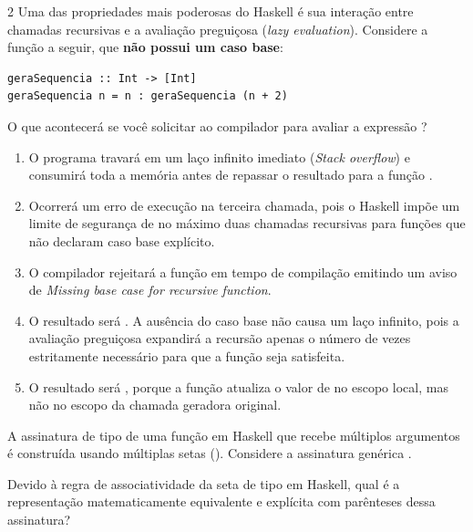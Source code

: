 \documentclass[a4paper,10pt,brazil]{article}
\begin{document}
\begin{multicols}{2}
Uma das propriedades mais poderosas do Haskell é sua interação entre chamadas recursivas e a avaliação preguiçosa (\emph{lazy evaluation}). Considere a função a seguir, que \textbf{não possui um caso base}:

\begin{verbatim}
geraSequencia :: Int -> [Int]
geraSequencia n = n : geraSequencia (n + 2)
\end{verbatim}

O que acontecerá se você solicitar ao compilador para avaliar a expressão ?

\begin{enumerate}
  \item O programa travará em um laço infinito imediato (\emph{Stack overflow}) e consumirá toda a memória antes de repassar o resultado para a função .

  \item Ocorrerá um erro de execução na terceira chamada, pois o Haskell impõe um limite de segurança de no máximo duas chamadas recursivas para funções que não declaram caso base explícito.
  \item O compilador rejeitará a função  em tempo de compilação emitindo um aviso de \emph{Missing base case for recursive function}.

  \item O resultado será \haskellinline{[10, 12, 14]}. A ausência do caso base não causa um laço infinito, pois a avaliação preguiçosa expandirá a recursão apenas o número de vezes estritamente necessário para que a função  seja satisfeita.

  \item O resultado será \haskellinline{[10, 10, 10]}, porque a função atualiza o valor de  no escopo local, mas não no escopo da chamada geradora original.


\end{enumerate}

A assinatura de tipo de uma função em Haskell que recebe múltiplos argumentos é construída usando múltiplas setas (\haskellinline{->}). Considere a assinatura genérica . 

Devido à regra de associatividade da seta de tipo em Haskell, qual é a representação matematicamente equivalente e explícita com parênteses dessa assinatura?


\end{multicols}
\end{document}
